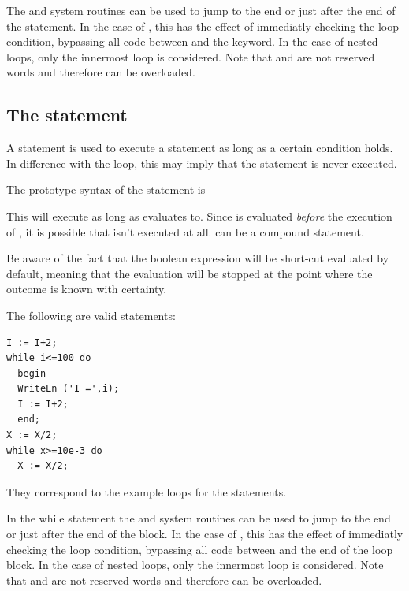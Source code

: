 The  and  system routines can be used to jump to
the end or just after the end of the  statement.
In the case of , this has the effect of immediatly checking the
loop condition, bypassing all code between  and the 
keyword. In the case of nested loops, only the innermost loop is considered.
Note that  and  are not reserved words and
therefore can be overloaded.

\subsection{The  statement}
 
A  statement is used to execute a statement as long as a certain
condition holds. In difference with the  loop, this may imply
that the statement is never executed.

The prototype syntax of the  statement is

This will execute  as long as  evaluates
to. Since  is evaluated {\em before} the execution
of , it is possible that  isn't executed at
all.  can be a compound statement.

Be aware of the fact that the boolean expression  will be
short-cut evaluated by default, meaning that the evaluation will be stopped
at the point where the outcome is known with certainty.

The following are valid  statements:
\begin{verbatim}
I := I+2;
while i<=100 do
  begin
  WriteLn ('I =',i);
  I := I+2;
  end;
X := X/2;
while x>=10e-3 do
  X := X/2;
\end{verbatim}
They correspond to the example loops for the  statements.

In the while statement the  and  system routines can be used to 
jump to the end or just after the end of the  block. 
In the case of , this has the effect of immediatly checking the loop condition,
bypassing all code between  and the end of the loop block.
In the case of nested loops, only the innermost loop is considered.
Note that  and  are not reserved words and
therefore can be overloaded.

